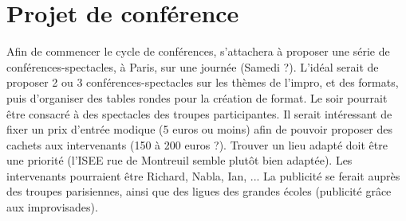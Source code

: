 \section{Projet de conférence}
Afin de commencer le cycle de conférences, \meta{} s'attachera à proposer une série de conférences-spectacles, à Paris, sur une journée (Samedi ?). L'idéal serait de proposer 2 ou 3 conférences-spectacles sur les thèmes de l'impro, et des formats, puis d'organiser des tables rondes pour la création de format. Le soir pourrait être consacré à des spectacles des troupes participantes. Il serait intéressant de fixer un prix d'entrée modique (5 euros ou moins) afin de pouvoir proposer des cachets aux intervenants (150 à 200 euros ?).
Trouver un lieu adapté doit être une priorité (l'ISEE rue de Montreuil semble plutôt bien adaptée). Les intervenants pourraient être Richard, Nabla, Ian, ...
La publicité se ferait auprès des troupes parisiennes, ainsi que des ligues des grandes écoles (publicité grâce aux improvisades).
